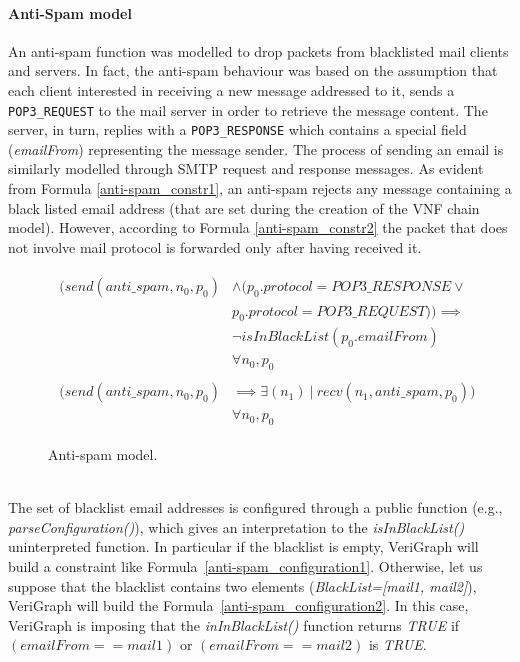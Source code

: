 \paragraph{Anti-Spam model}An anti-spam function was modelled to drop packets from blacklisted mail clients and servers. In fact, the anti-spam behaviour was based on the assumption that each client interested in receiving a new message addressed to it, sends a \texttt{POP3\_REQUEST} to the mail server in order to retrieve the message content. The server, in turn, replies with a \texttt{POP3\_RESPONSE} which contains a special field (\textit{emailFrom}) representing the message sender. The process of sending an email is similarly modelled through SMTP request and response messages. As evident from Formula \ref{anti-spam_constr1}, an anti-spam rejects any message containing a black listed email address (that are set during the creation of the VNF chain model). However, according to  Formula \ref{anti-spam_constr2} the packet that does not involve mail protocol is forwarded only after having received it.
\begin{figure}[h]
	{\footnotesize
		\begin{subequations}
			\begin{align}
				\begin{split}
					\label{anti-spam_constr1}
					(send(anti\_spam, n_{0}, p_{0}) & \wedge (p_{0}.protocol = POP3\_RESPONSE \vee \\
					& p_{0}.protocol = POP3\_REQUEST)) \implies \\
					&  \neg isInBlackList(p_{0}.emailFrom) \\
					& \forall n_{0}, p_{0}
				\end{split} \\
				\begin{split}
					\label{anti-spam_constr2}
					(send(anti\_spam, n_{0}, p_{0})& \implies  \exists (n_{1}) \: | \:  recv(n_{1}, anti\_spam, p_{0})) \\
					& \forall n_{0}, p_{0}
				\end{split}
			\end{align}
		\end{subequations}
	}%
	\caption{Anti-spam model.}
	\label{anti-spam_model}
\end{figure}
\\
The set of blacklist email addresses is configured through a public function (e.g., \textit{parseConfiguration()}), which gives an interpretation to the \textit{isInBlackList()} uninterpreted function. In particular if the blacklist is empty, VeriGraph will build a constraint like Formula~\ref{anti-spam_configuration1}. Otherwise, let us suppose that the blacklist contains two elements (\textit{BlackList=[mail1, mail2]}), VeriGraph will build the Formula~\ref{anti-spam_configuration2}. In this case, VeriGraph is imposing that the \textit{inInBlackList()} function returns \textit{TRUE} if \textit{$(emailFrom == mail1)$} or \textit{$(emailFrom == mail2)$} is \textit{TRUE}.
